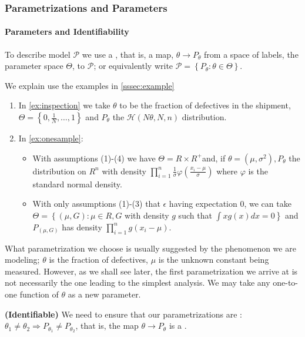 \documentclass{article}
\newcommand{\bfs}[1]{\textbf{({#1}) }}
\begin{document}
\subsubsection{Parametrizations and Parameters}
\paragraph{Parameters and Identifiability}
\begin{defa}
To describe model $\mathcal{P}$ we use a , that is, a map, $\theta \rightarrow P_{\theta}$ from a space of labels, the parameter space $\Theta$, to $\mathcal{P}$; or equivalently write $\mathcal{P}=\left\{P_{\theta}: \theta \in \Theta\right\}$.
\end{defa} 
\begin{exma}We explain use the examples in \cref{sssec:example}
\begin{enumerate} 
    \item  In \cref{ex:inspection} we take $\theta$ to be the fraction of defectives in the shipment, $\Theta=\left\{0, \frac{1}{N}, \ldots, 1\right\}$ and $P_{\theta}$ the $\mathcal{H}(N \theta, N, n)$ distribution. 
    \item In \cref{ex:onesample}:
    \begin{itemize}
        \item With assumptions (1)-(4) we have $\Theta=R \times R^{+}$and, if $\theta=\left(\mu, \sigma^{2}\right), P_{\theta}$ the distribution on $R^{n}$ with density $\prod_{i=1}^{n} \frac{1}{\sigma} \varphi\left(\frac{x_{i}-\mu}{\sigma}\right)$ where $\varphi$ is the standard normal density. 
        \item With only assumptions (1)-(3) that $\epsilon$ having expectation 0, we can take $\Theta=\left\{(\mu, G): \mu \in R, G\right.$ with density $g$ such that $\left.\int x g(x) d x=0\right\}$ and $P_{(\mu, G)}$ has density $\prod_{i=1}^{n} g\left(x_{i}-\mu\right)$.
    \end{itemize} 
\end{enumerate}
\end{exma}

What parametrization we choose is usually suggested by the phenomenon we are modeling; $\theta$ is the fraction of defectives, $\mu$ is the unknown constant being measured. However, as we shall see later, the first parametrization we arrive at is not necessarily the one leading to the simplest analysis. We may take any one-to-one function of $\theta$ as a new parameter.
\begin{defa}\bfs{Identifiable}
 We need to ensure that our parametrizations are :  $\theta_{1} \neq \theta_{2} \Rightarrow P_{\theta_{1}} \neq P_{\theta_{2}}$, that is, the map $\theta \rightarrow P_{\theta}$ is a . 
\end{defa}
\end{document}
